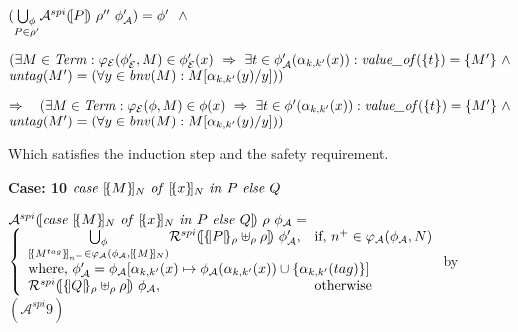 \documentclass[10pt,a4paper,final,oneside,fleqn]{book}
\begin{document}
\noindent
$(\underset{P\in\rho'}{\bigcup_\phi}\mathcal{A}^{spi}(\![P]\!)~\rho''~\phi'_\mathcal{A})=\phi'~~\wedge\vspace{3mm}$

\noindent
$(\exists M\in\mbox{{\itshape Term\/}}:\varphi_\mathcal{E}(\phi'_\mathcal{E},M)\in\phi'_\mathcal{E}(x)~\Rightarrow~\exists t\in\phi'_\mathcal{A}(\alpha_{k,k'}(x)):\mbox{{\itshape value\_of\/}}(\{t\})=\{M'\}~\wedge$\\
$\mbox{{\itshape untag\/}}(M')=(\forall y\in\mbox{{\itshape bnv\/}}(M):M[\alpha_{k,k'}(y)/y]))$\vspace{5mm}

\noindent
$\Rightarrow~~~(\exists M\in\mbox{{\itshape Term\/}}:\varphi_\mathcal{E}(\phi,M)\in\phi(x)~\Rightarrow~\exists t\in\phi'(\alpha_{k,k'}(x)): \mbox{{\itshape value\_of\/}}(\{t\})=\{M'\}~\wedge$\\
$\mbox{{\itshape untag\/}}(M')=(\forall y\in\mbox{{\itshape bnv\/}}(M):M[\alpha_{k,k'}(y)/y]))$\vspace{5mm}

\noindent
Which satisfies the induction step and the safety requirement.

\clearpage
\noindent
{\bf Case: 10} $\mbox{{\itshape case\/} }[\!\{M\}\!]_N\mbox{ {\itshape of\/} }[\!\{x\}\!]_N\mbox{ {\itshape in\/} }P\mbox{ {\itshape else\/} }Q$

\noindent
$\mathcal{A}^{spi}(\![\mbox{{\itshape case\/} }[\!\{M\}\!]_N\mbox{ {\itshape of\/} }[\!\{x\}\!]_N\mbox{ {\itshape in\/} }P\mbox{ {\itshape else\/} }Q]\!)~\rho~\phi_\mathcal{A}=$\\
$\left\{\begin{array}{ll}
\underset{[\!\{M^{tag}\}\!]_{n^-}\in\varphi_\mathcal{A}(\phi_\mathcal{A},[\!\{M\}\!]_N)}{\bigcup_\phi}\mathcal{R}^{spi}(\![\{\!|P|\!\}_\rho\uplus_\rho\rho]\!)~\phi'_\mathcal{A},&\mbox{if, }n^+\in\varphi_\mathcal{A}(\phi_\mathcal{A},N)\\
\multicolumn{2}{l}{\mbox{where, }\phi'_\mathcal{A}=\phi_\mathcal{A}[\alpha_{k,k'}(x)\mapsto\phi_\mathcal{A}(\alpha_{k,k'}(x))\cup\{\alpha_{k,k'}({tag})\}]}\\
\mathcal{R}^{spi}(\![\{\!|Q|\!\}_\rho\uplus_\rho\rho]\!)~\phi_\mathcal{A},&\mbox{otherwise}\\
\end{array}\right.$\hfill by $(\mathcal{A}^{spi} 9)$\vspace{5mm}
\end{document}
